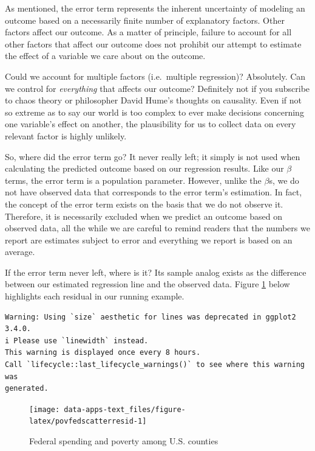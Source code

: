 \documentclass[
]{book}
\begin{document}
As mentioned, the error term represents the inherent uncertainty of modeling an outcome based on a necessarily finite number of explanatory factors. Other factors affect our outcome. As a matter of principle, failure to account for all other factors that affect our outcome does not prohibit our attempt to estimate the effect of a variable we care about on the outcome.

Could we account for multiple factors (i.e.~multiple regression)? Absolutely. Can we control for \emph{everything} that affects our outcome? Definitely not if you subscribe to chaos theory or philosopher David Hume's thoughts on causality. Even if not so extreme as to say our world is too complex to ever make decisions concerning one variable's effect on another, the plausibility for us to collect data on every relevant factor is highly unlikely.

So, where did the error term go? It never really left; it simply is not used when calculating the predicted outcome based on our regression results. Like our \(\beta\) terms, the error term is a population parameter. However, unlike the \(\beta\)s, we do not have observed data that corresponds to the error term's estimation. In fact, the concept of the error term exists on the basis that we do not observe it. Therefore, it is necessarily excluded when we predict an outcome based on observed data, all the while we are careful to remind readers that the numbers we report are estimates subject to error and everything we report is based on an average.

If the error term never left, where is it? Its sample analog exists as the difference between our estimated regression line and the observed data. Figure \ref{fig:povfedscatterresid} below highlights each residual in our running example.

\begin{verbatim}
Warning: Using `size` aesthetic for lines was deprecated in ggplot2 3.4.0.
i Please use `linewidth` instead.
This warning is displayed once every 8 hours.
Call `lifecycle::last_lifecycle_warnings()` to see where this warning was
generated.
\end{verbatim}

\begin{figure}

{\centering \texttt{[image: data-apps-text\_files/figure-latex/povfedscatterresid-1]} 

}

\caption{Federal spending and poverty among U.S. counties}\label{fig:povfedscatterresid}
\end{figure}
\end{document}
